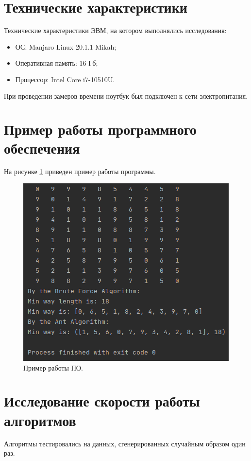 \documentclass[12pt]{report}
\begin{document}
\section{Технические характеристики}
Технические характеристики ЭВМ, на котором выполнялись исследования:
\begin{itemize}
\item ОС: Manjaro Linux 20.1.1 Mikah;
\item Оперативная память: 16 Гб;
\item Процессор: Intel Core i7-10510U.
\end{itemize}

При проведении замеров времени ноутбук был подключен к сети электропитания.

\section{Пример работы программного обеспечения}
На рисунке \ref{img:example} приведен пример работы программы.

\begin{figure}
\begin{center}
\includegraphics[scale=0.9]{inc/img/example.png}
\captionsetup{justification=centering}
	\caption{Пример работы ПО.}
	\label{img:example}	
\end{center}
\end{figure}
\newpage

\section{Исследование скорости работы алгоритмов}
Алгоритмы тестировались на данных, сгенерированных случайным образом один раз.
\end{document}
